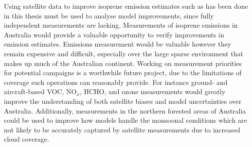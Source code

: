 {  Using satellite data to improve isoprene emission estimates such as has been done in this thesis must be used to analyse model improvements, since fully independent measurements are lacking.
  Measurements of isoprene emissions in Australia would provide a valuable opportunity to verify improvements in emission estimates.
  Emissions measurement would be valuable however they remain expensive and difficult, especially over the large sparse environment that makes up much of the Australian continent.
  Working on measurement priorities for potential campaigns is a worthwhile future project, due to the limitations of coverage such operations can reasonably provide.
  For instance ground- and aircraft-based VOC, NO$_x$, HCHO, and ozone measurements would greatly improve the understanding of both satellite biases and model uncertainties over Australia.
  Additionally, measurements in the northern forested areas of Australia could be used to improve how models handle the monsoonal conditions which are not likely to be accurately captured by satellite measurements due to increased cloud coverage.

}
